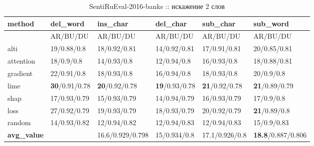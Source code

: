 \begin{table}[H]
  \centering
  \caption{SentiRuEval-2016-banks :: искажение 2 слов}
  {\renewcommand{\arraystretch}{1.5}
  {\fontsize{9pt}{10pt}\selectfont
  \begin{tabularx}{\textwidth}{|l|X|X|X|X|X|}
    \hline
     method    & del\_word         & ins\_char         & del\_char         & sub\_char         & sub\_word         \\
    \hline
     & AR/BU/DU & AR/BU/DU  & AR/BU/DU  & AR/BU/DU  & AR/BU/DU \\
    \hline
     alti      & 19/0.88/0.8 & 18/0.92/0.81 & 14/0.92/0.81 & 17/0.91/0.81 & 20/0.85/0.81 \\
    \hline
     attention & 18/0.9/0.8 & 14/0.93/0.8  & 12/0.94/0.8  & 16/0.93/0.8  & 18/0.88/0.81 \\
    \hline
     gradient  & 22/0.91/0.8 & 18/0.93/0.8  & 16/0.94/0.8  & 18/0.93/0.8  & 20/0.9/0.8 \\
    \hline
     lime      & \textbf{30}/0.91/0.78 & \textbf{20}/0.92/0.78 & \textbf{19}/0.93/0.78 & \textbf{21}/0.92/0.78 & \textbf{21}/0.89/0.79 \\
    \hline
     shap      & 17/0.93/0.79 & 15/0.93/0.79 & 14/0.94/0.79 & 16/0.93/0.79 & 17/0.9/0.8 \\
    \hline
     loss      & 27/0.92/0.79 & 19/0.93/0.79 & 18/0.93/0.79 & 20/0.92/0.79 & \textbf{21}/0.89/0.8 \\
    \hline
     random    & 14/0.93/0.82 & 12/0.94/0.82 & 12/0.94/0.83 & 12/0.94/0.83 & 15/0.9/0.83 \\
    \hline
     \textbf{avg\_value} & \cellcolor{gray!25} & 16.6/0.929/0.798 & 15/0.934/0.8 & 17.1/0.926/0.8 & \textbf{18.8}/0.887/0.806 \\
    \hline
    \end{tabularx}
    }
    }
\end{table}

